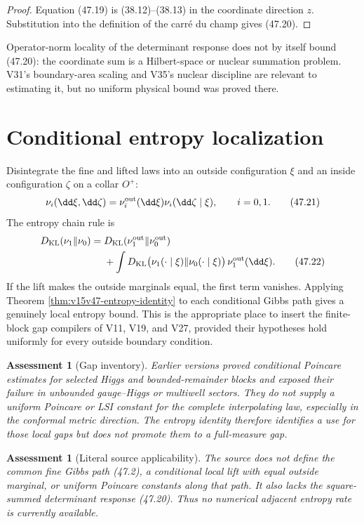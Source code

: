 \documentclass[11pt]{article}
\newtheorem{assessment}[theorem]{Assessment}
\theoremstyle{remark}
\begin{document}
\begin{proof}
Equation (47.19) is (38.12)--(38.13) in the coordinate direction
\(z\).  Substitution into the definition of the carré du champ
gives (47.20).
\end{proof}

Operator-norm locality of the determinant response does not by
itself bound (47.20): the coordinate sum is a Hilbert-space or
nuclear summation problem.  V31's boundary-area scaling and
V35's nuclear discipline are relevant to estimating it, but no
uniform physical bound was proved there.

\section{Conditional entropy localization}

Disintegrate the fine and lifted laws into an outside configuration
\(\xi\) and an inside configuration \(\zeta\) on a collar \(O^+\):
\[
 \nu_i(\dd\xi,\dd\zeta)
 =\nu_i^{\rm out}(\dd\xi)\nu_i(\dd\zeta\mid\xi),
 \qquad i=0,1.                                           \tag{47.21}
\]
The entropy chain rule is
\[
 \begin{split}
 D_{\rm KL}(\nu_1\Vert\nu_0)
 ={}&D_{\rm KL}(\nu_1^{\rm out}\Vert\nu_0^{\rm out})\\
 &+\int D_{\rm KL}\bigl(
 \nu_1(\cdot\mid\xi)\Vert\nu_0(\cdot\mid\xi)\bigr)
 \,\nu_1^{\rm out}(\dd\xi).                             \tag{47.22}
 \end{split}
\]
If the lift makes the outside marginals equal, the first term
vanishes.  Applying Theorem \ref{thm:v15v47-entropy-identity} to
each conditional Gibbs path gives a genuinely local entropy bound.
This is the appropriate place to insert the finite-block gap
compilers of V11, V19, and V27, provided their hypotheses hold
uniformly for every outside boundary condition.

\begin{assessment}[Gap inventory]
\label{ass:v15v47-gap}
Earlier versions proved conditional Poincare estimates for selected
Higgs and bounded-remainder blocks and exposed their failure in
unbounded gauge--Higgs or multiwell sectors.  They do not supply a
uniform Poincare or LSI constant for the complete interpolating law,
especially in the conformal metric direction.  The entropy identity
therefore identifies a use for those local gaps but does not promote
them to a full-measure gap.
\end{assessment}

\begin{assessment}[Literal source applicability]
\label{ass:v15v47-source}
The source does not define the common fine Gibbs path (47.2), a
conditional local lift with equal outside marginal, or uniform
Poincare constants along that path.  It also lacks the square-summed
determinant response (47.20).  Thus no numerical adjacent entropy
rate is currently available.
\end{assessment}
\end{document}
